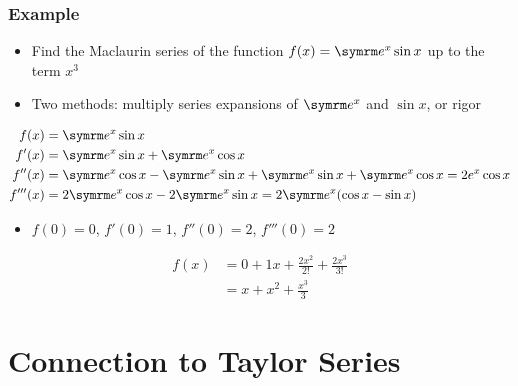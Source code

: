\documentclass{beamer}
\begin{document}
\begin{frame}
  \frametitle{Example}
  \begin{itemize}
    \item Find the Maclaurin series of the function \( f(x) = \e^x\sin x \) up to the term \( x^3 \)
    \item Two methods: multiply series expansions of \( \e^x \) and \( \sin x \), or rigor
  \end{itemize}
  \begin{align*}
    f(x) & = \e^x\sin x \\
    f'(x) & = \e^x\sin x + \e^x\cos x \\
    f''(x) & = \e^x\cos x - \e^x\sin x + \e^x\sin x + \e^x\cos x = 2e^x\cos x \\
    f'''(x) & = 2\e^x\cos x - 2\e^x\sin x = 2\e^x(\cos x - \sin x)
  \end{align*}
  \begin{itemize}
    \item \( f(0) = 0 \), \( f'(0) = 1 \), \( f''(0) = 2 \), \( f'''(0) = 2 \)
  \end{itemize}
  \begin{align*}
    f(x) & = 0 + 1x + \frac{2x^2}{2!} + \frac{2x^3}{3!} \\
    & = x + x^2 + \frac{x^3}{3}
  \end{align*}
\end{frame}

\section{Connection to Taylor Series}
\end{document}
